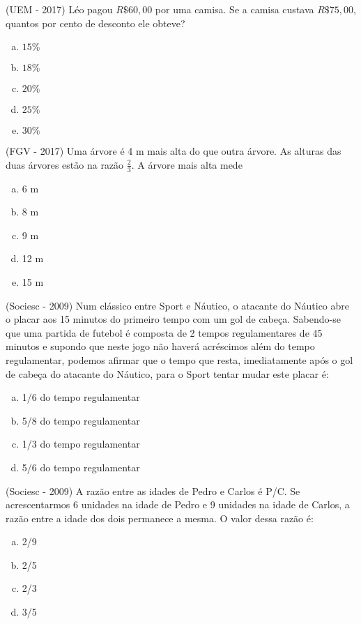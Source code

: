     \begin{exer} (UEM - 2017) Léo pagou $R\$ 60,00$ por uma camisa. Se a camisa custava $R\$ 75,00$, quantos por cento de desconto ele obteve?
    \begin{enumerate}[a)]
    \item $15 \%$
    \item $18 \%$
    \item $20 \%$
    \item $25 \%$
    \item $30 \%$
    \end{enumerate}
    \end{exer}

    \begin{exer} (FGV - 2017) Uma árvore é 4 m mais alta do que outra árvore. As alturas das duas árvores estão na razão $\frac{2}{3}$. A árvore mais alta mede
    \begin{enumerate}[a)]
    \item 6 m
    \item 8 m
    \item 9 m
    \item 12 m
    \item 15 m
    \end{enumerate}
    \end{exer}


    \begin{exer} (Sociesc - 2009) Num clássico entre Sport e Náutico, o atacante do Náutico abre o placar aos 15 minutos do primeiro tempo com um gol de cabeça. Sabendo-se que uma partida de futebol é composta de 2 tempos regulamentares de 45 minutos e supondo que neste jogo não haverá acréscimos além do tempo regulamentar, podemos afirmar que o tempo que resta, imediatamente após o gol de cabeça do atacante do Náutico, para o Sport tentar mudar este placar é:
  \begin{enumerate}[a)]
  \item 1/6 do tempo regulamentar
  \item 5/8 do tempo regulamentar
  \item 1/3 do tempo regulamentar
  \item 5/6 do tempo regulamentar
 \end{enumerate}
 \end{exer}

\begin{exer} (Sociesc - 2009) A razão entre as idades de Pedro e Carlos é P/C. Se acrescentarmos 6 unidades na idade de Pedro e 9 unidades na idade de Carlos, a razão entre a idade dos dois permanece a mesma. O valor dessa razão é:
  \begin{enumerate}[a)]
  \item 2/9
  \item 2/5
  \item 2/3
  \item 3/5
 \end{enumerate}
 \end{exer}


